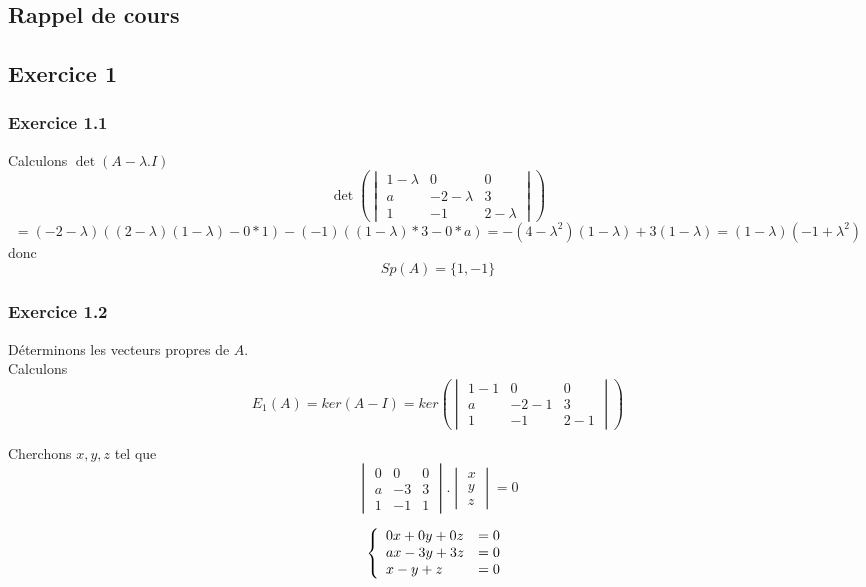 \documentclass[]{book}
\theoremstyle{definition}
\begin{document}
\subsection*{Rappel de cours}



\newpage
\subsection*{Exercice 1}
\subsubsection*{Exercice 1.1}
Calculons $\det(A-\lambda.I)$
$$\det \left( \begin{vmatrix} 1 - \lambda & 0 & 0 \\ a & -2 - \lambda & 3 \\  1 & -1 & 2 -\lambda \end{vmatrix}\right) $$
$$= (-2-\lambda)((2-\lambda)(1-\lambda)-0*1) - (-1)((1-\lambda)*3 -0*a) = -(4-\lambda^2)(1-\lambda)+3(1-\lambda) = (1-\lambda)(-1+\lambda^2)$$
donc
$$Sp(A) = \{1, -1\}$$

\subsubsection*{Exercice 1.2}
D\'eterminons les vecteurs propres de $A$.\\
Calculons 
$$E_{1}(A)=ker(A-I) = ker\left( \begin{vmatrix} 1 - 1 & 0 & 0 \\ a & -2 - 1 & 3 \\  1 & -1 & 2 - 1 \end{vmatrix} \right)$$

Cherchons $x,y,z$ tel que
$$\begin{vmatrix} 0 & 0 & 0 \\ a & -3 & 3 \\  1 & -1 & 1 \end{vmatrix} . \begin{vmatrix} x \\ y \\  z \end{vmatrix} = 0$$

$$
\left\{ 
\begin{array}{l l}
0x + 0y + 0z & = 0\\
ax - 3y + 3z & = 0\\
x - y + z & = 0\\
\end{array}
\right. 
$$ 
\end{document}
